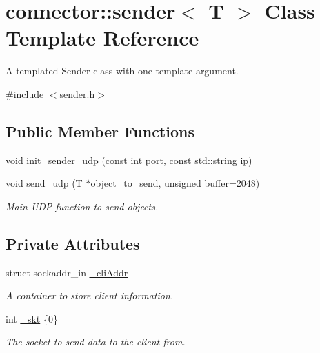 \hypertarget{classconnector_1_1sender}{}\section{connector\+:\+:sender$<$ T $>$ Class Template Reference}
\label{classconnector_1_1sender}


A templated Sender class with one template argument.  




{\ttfamily \#include $<$sender.\+h$>$}

\subsection*{Public Member Functions}
\begin{DoxyCompactItemize}
\item 
void \hyperlink{classconnector_1_1sender_ae9cd837112f0cbca040abe23a2a6ee9e}{init\+\_\+sender\+\_\+udp} (const int port, const std\+::string ip)
\item 
void \hyperlink{classconnector_1_1sender_af7f9d1a8b7939539040de4024d2a48ed}{send\+\_\+udp} (T $\ast$object\+\_\+to\+\_\+send, unsigned buffer=2048)
\begin{DoxyCompactList}\small\item\em Main U\+DP function to send objects. \end{DoxyCompactList}\end{DoxyCompactItemize}
\subsection*{Private Attributes}
\begin{DoxyCompactItemize}
\item 
struct sockaddr\+\_\+in \hyperlink{classconnector_1_1sender_a340dd695c5b8606e2a94c0fa9dbe8e0b}{\+\_\+cli\+Addr}
\begin{DoxyCompactList}\small\item\em A container to store client information. \end{DoxyCompactList}\item 
int \hyperlink{classconnector_1_1sender_ae911e30ba70379091f3a995b3e56c81e}{\+\_\+skt} \{0\}\hypertarget{classconnector_1_1sender_ae911e30ba70379091f3a995b3e56c81e}{}\label{classconnector_1_1sender_ae911e30ba70379091f3a995b3e56c81e}

\begin{DoxyCompactList}\small\item\em The socket to send data to the client from. \end{DoxyCompactList}\end{DoxyCompactItemize}


